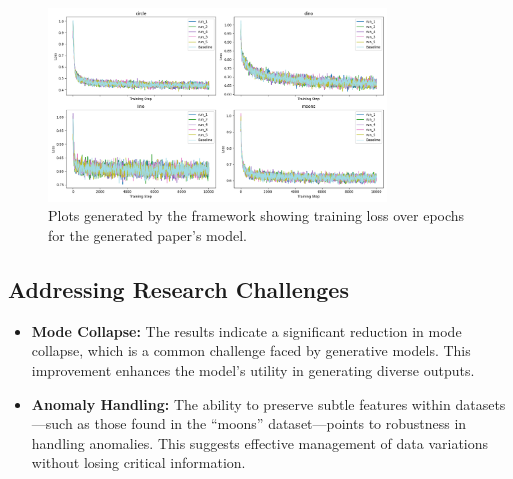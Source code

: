 \begin{figure}[t]
    \centering
    \includegraphics[width=0.8\textwidth, height=0.7\textwidth]{images/train_loss.png}
    \caption{Plots generated by the framework showing training loss over epochs for the generated paper's model.}
    \label{fig:output_b} %
\end{figure}

\subsection{Addressing Research Challenges}
\begin{itemize}
    \item \textbf{Mode Collapse:} The results indicate a significant reduction in mode collapse, which is a common challenge faced by generative models. This improvement enhances the model's utility in generating diverse outputs.
    \item \textbf{Anomaly Handling:} The ability to preserve subtle features within datasets—such as those found in the ``moons'' dataset—points to robustness in handling anomalies. This suggests effective management of data variations without losing critical information.
\end{itemize}






